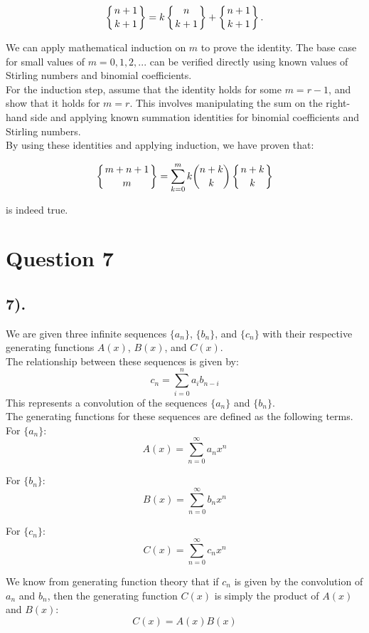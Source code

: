 \documentclass[12pt]{article}
\begin{document}
\[
\left\{ n+1 \atop k+1 \right\} = k \left\{ n \atop k+1 \right\} + \left\{ n+1 \atop k+1 \right\}.
\]

We can apply mathematical induction on \( m \) to prove the identity. The base case for small values of \( m = 0, 1, 2, ... \) can be verified directly using known values of Stirling numbers and binomial coefficients.\\

For the induction step, assume that the identity holds for some \( m = r-1 \), and show that it holds for \( m = r \). This involves manipulating the sum on the right-hand side and applying known summation identities for binomial coefficients and Stirling numbers.\\

By using these identities and applying induction, we have proven that:

\[
\left\{ m + n + 1 \atop m \right\} = \sum_{k=0}^{m} k \binom{n+k}{k} \left\{ n+k \atop k \right\}
\]

is indeed true.

\section*{Question 7}
\subsection*{7).}

We are given three infinite sequences $\{a_n\}$, $\{b_n\}$, and $\{c_n\}$ with their respective generating functions $A(x)$, $B(x)$, and $C(x)$.\\

The relationship between these sequences is given by:
\[
c_n = \sum_{i=0}^{n} a_i b_{n-i}
\]
This represents a convolution of the sequences $\{a_n\}$ and $\{b_n\}$.\\

The generating functions for these sequences are defined as the following terms.\\

For $\{a_n\}$: 
  \[
  A(x) = \sum_{n=0}^{\infty} a_n x^n
  \]
  
For $\{b_n\}$: 
  \[
  B(x) = \sum_{n=0}^{\infty} b_n x^n
  \]
  
For $\{c_n\}$: 
  \[
  C(x) = \sum_{n=0}^{\infty} c_n x^n
  \]

We know from generating function theory that if $c_n$ is given by the convolution of $a_n$ and $b_n$, then the generating function $C(x)$ is simply the product of $A(x)$ and $B(x)$:
\[
C(x) = A(x) B(x)
\]
\end{document}
